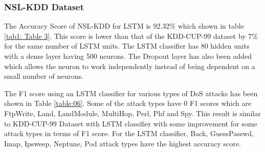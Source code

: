 \documentclass[conference]{IEEEtran}
\begin{document}
\subsubsection{NSL-KDD Dataset}

The Accuracy Score of NSL-KDD for LSTM is 92.32\% which shown in table \ref{tab1: Table 3}. This score is lower than that of the KDD-CUP-99 dataset by 7\% for the same number of LSTM units. The LSTM classifier has 80 hidden units with a dense layer having 500 neurons. The Dropout layer has also been added which allows the neuron to work independently instead of being dependent on a small number of neurons.

The F1 score using an LSTM classifier for various types of DoS attacks has been shown in Table \ref{table:06}. Some of the attack types have 0 F1 scores which are FtpWrite, Land, LandModule, MultiHop, Perl, Phf and Spy. This result is similar to KDD-CUP-99 Dataset with LSTM classifier with some improvement for some attack types in terms of F1 score. For the LSTM classifier, Back, GuessPasswd, Imap, Ipsweep, Neptune, Pod attack types have the highest accuracy score.
\end{document}
